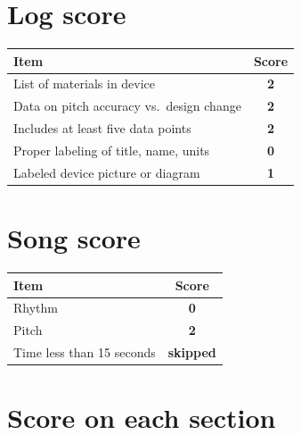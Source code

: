 \documentclass[12pt,letterpaper]{article}
\def\logOne{2}   %
\def\logTwo{2}   %
\def\logThree{2} %
\def\logFour{0}  %
\def\logFive{1}  %
\def\songRhythm{0}
\def\songPitch{2}
\def\songTime{skipped}
\begin{document}

\begin{multicols}{2}
\section{Log score}

\begin{tabular}{lc}
\textbf{Item} & \multicolumn{1}{p{16mm}}{\centering\textbf{Score}}\\
\hline
List of materials in device & \bfseries\cellcolor{hyblue!20}\logOne\\
Data on pitch accuracy vs.\ design change & \bfseries\cellcolor{hyblue!20}\logTwo \\
Includes at least five data points & \bfseries\cellcolor{hyblue!20}\logThree \\
Proper labeling of title, name, units & \bfseries\cellcolor{hyblue!20}\logFour\\
Labeled device picture or diagram & \bfseries\cellcolor{hyblue!20}\logFive \\
\hline
\end{tabular}

\section{Song score}

\begin{tabular}{lc}
\textbf{Item} & \multicolumn{1}{p{16mm}}{\centering\textbf{Score}} \\
\hline
Rhythm & \bfseries\cellcolor{hyblue!20}\songRhythm \\
Pitch  & \bfseries\cellcolor{hyblue!20}\songPitch  \\
Time less than 15 seconds & \bfseries\cellcolor{hyblue!20}\songTime   \\
\hline
\end{tabular}
\end{multicols}
\vspace{-1cm}
\hfill{}


\section{Score on each section}
\end{document}
